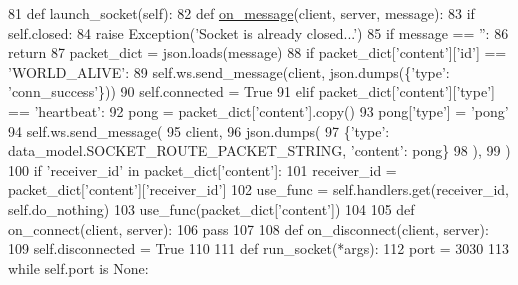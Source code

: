 \begin{DoxyCode}
81     \textcolor{keyword}{def }launch\_socket(self):
82         \textcolor{keyword}{def }\hyperlink{namespaceparlai_1_1chat__service_1_1services_1_1terminal__chat_1_1client_a0ef2bb2bd3b966dcdd8402a92b999708}{on\_message}(client, server, message):
83             \textcolor{keywordflow}{if} self.closed:
84                 \textcolor{keywordflow}{raise} Exception(\textcolor{stringliteral}{'Socket is already closed...'})
85             \textcolor{keywordflow}{if} message == \textcolor{stringliteral}{''}:
86                 \textcolor{keywordflow}{return}
87             packet\_dict = json.loads(message)
88             \textcolor{keywordflow}{if} packet\_dict[\textcolor{stringliteral}{'content'}][\textcolor{stringliteral}{'id'}] == \textcolor{stringliteral}{'WORLD\_ALIVE'}:
89                 self.ws.send\_message(client, json.dumps(\{\textcolor{stringliteral}{'type'}: \textcolor{stringliteral}{'conn\_success'}\}))
90                 self.connected = \textcolor{keyword}{True}
91             \textcolor{keywordflow}{elif} packet\_dict[\textcolor{stringliteral}{'content'}][\textcolor{stringliteral}{'type'}] == \textcolor{stringliteral}{'heartbeat'}:
92                 pong = packet\_dict[\textcolor{stringliteral}{'content'}].copy()
93                 pong[\textcolor{stringliteral}{'type'}] = \textcolor{stringliteral}{'pong'}
94                 self.ws.send\_message(
95                     client,
96                     json.dumps(
97                         \{\textcolor{stringliteral}{'type'}: data\_model.SOCKET\_ROUTE\_PACKET\_STRING, \textcolor{stringliteral}{'content'}: pong\}
98                     ),
99                 )
100             \textcolor{keywordflow}{if} \textcolor{stringliteral}{'receiver\_id'} \textcolor{keywordflow}{in} packet\_dict[\textcolor{stringliteral}{'content'}]:
101                 receiver\_id = packet\_dict[\textcolor{stringliteral}{'content'}][\textcolor{stringliteral}{'receiver\_id'}]
102                 use\_func = self.handlers.get(receiver\_id, self.do\_nothing)
103                 use\_func(packet\_dict[\textcolor{stringliteral}{'content'}])
104 
105         \textcolor{keyword}{def }on\_connect(client, server):
106             \textcolor{keywordflow}{pass}
107 
108         \textcolor{keyword}{def }on\_disconnect(client, server):
109             self.disconnected = \textcolor{keyword}{True}
110 
111         \textcolor{keyword}{def }run\_socket(*args):
112             port = 3030
113             \textcolor{keywordflow}{while} self.port \textcolor{keywordflow}{is} \textcolor{keywordtype}{None}:

\end{DoxyCode}
